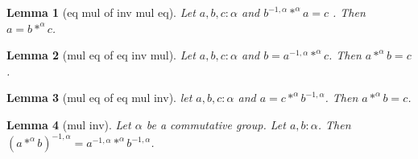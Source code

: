 \documentclass[12pt]{article}
\newtheorem{lemma}{Lemma}
\begin{document}
\begin{lemma}[eq mul of inv mul eq] Let $a,b,c : \alpha$ and
$b^{-1,\alpha} *^{\alpha} a = c$ . Then $a = b *^{\alpha} c$.
\end{lemma}

\begin{lemma}[mul eq of eq inv mul] Let $a,b,c : \alpha$ and
$b = a^{-1,\alpha} *^{\alpha} c$. Then $a *^{\alpha} b = c$.
\end{lemma}

\begin{lemma}[mul eq of eq mul inv] let $a,b,c : \alpha$ and
$a = c *^{\alpha} b^{-1,\alpha}$. Then $a *^{\alpha} b = c$.
\end{lemma}

\begin{lemma}[mul inv] Let $\alpha$ be a commutative group. 
Let $a,b : \alpha$. Then
$(a *^{\alpha} b)^{-1,\alpha} = a^{-1,\alpha} *^{\alpha} b^{-1,\alpha}$.
\end{lemma}
\end{document}

